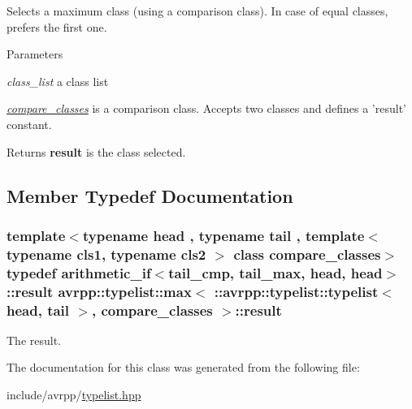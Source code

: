 Selects a maximum class (using a comparison class). In case of equal classes, prefers the first one. 
\begin{DoxyParams}{Parameters}
\item[{\em class\_\-list}]a class list \item[{\em \hyperlink{structavrpp_1_1typelist_1_1compare__classes}{compare\_\-classes}}]is a comparison class. Accepts two classes and defines a 'result' constant. \end{DoxyParams}
\begin{DoxyReturn}{Returns}
{\bfseries result} is the class selected. 
\end{DoxyReturn}


\subsection{Member Typedef Documentation}
\hypertarget{classavrpp_1_1typelist_1_1max_3_01_1_1avrpp_1_1typelist_1_1typelist_3_01head_00_01tail_01_4_00_01compare__classes_01_4_a6e51ebe5ed6f1057cfd03426d7efde21}{
\subsubsection[{result}]{\setlength{\rightskip}{0pt plus 5cm}template$<$typename head , typename tail , template$<$ typename cls1, typename cls2 $>$ class compare\_\-classes$>$ typedef {\bf arithmetic\_\-if}$<$tail\_\-cmp, tail\_\-max, head, head$>$::{\bf result} avrpp::typelist::max$<$ ::{\bf avrpp::typelist::typelist}$<$ head, tail $>$, {\bf compare\_\-classes} $>$::{\bf result}}}
\label{classavrpp_1_1typelist_1_1max_3_01_1_1avrpp_1_1typelist_1_1typelist_3_01head_00_01tail_01_4_00_01compare__classes_01_4_a6e51ebe5ed6f1057cfd03426d7efde21}


The result. 



The documentation for this class was generated from the following file:\begin{DoxyCompactItemize}
\item 
include/avrpp/\hyperlink{typelist_8hpp}{typelist.hpp}\end{DoxyCompactItemize}
